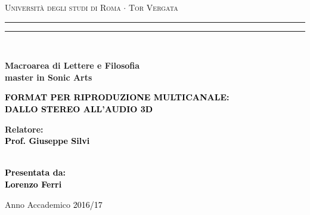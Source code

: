 \documentclass[12pt,a4paper]{report}
\begin{document}
\begin{titlepage}
\begin{center}
{\Large{\textsc{Università degli studi di Roma $\cdot$ Tor Vergata}}} 
\rule[0.1cm]{15.8cm}{0.1mm}
\rule[0.5cm]{15.8cm}{0.6mm}
\\\vspace{3mm}

{\small{\bf Macroarea di Lettere e Filosofia \\ master in Sonic Arts}}

\end{center}

\vspace{23mm}

\begin{center}
\begin{spacing}{1.7}
\textcolor{black}{
\linespread{5}
{\LARGE{\bf 
FORMAT PER RIPRODUZIONE MULTICANALE:
}}\\ 
{\LARGE{\bf 
DALLO STEREO ALL'AUDIO 3D
}}}

\end{spacing}
\end{center}

\vspace{50mm} \par \noindent

\begin{minipage}[t]{0.47\textwidth}

{\large{\bf Relatore: \vspace{2mm}\\\textcolor{black}{
Prof. Giuseppe Silvi}\\\\

}
}
\end{minipage}
%
\hfill
%
\begin{minipage}[t]{0.47\textwidth}\raggedleft \textcolor{black}{
{\large{\bf Presentata da:
\vspace{2mm}\\
%
%
Lorenzo Ferri}}}
\end{minipage}

\vspace{17mm}

\begin{center}

{\large{%

Anno Accademico \textcolor{black}{2016/17}}}
\end{center}

\newpage\null\thispagestyle{empty}

\end{titlepage}
\end{document}
